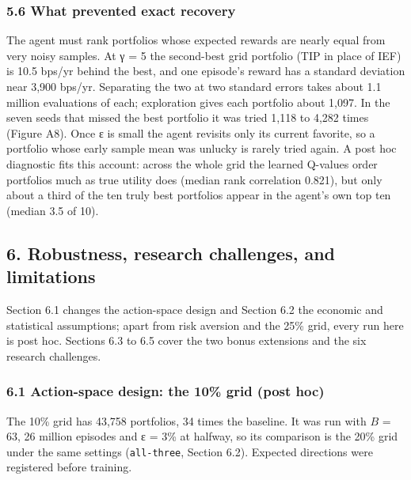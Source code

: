 \documentclass[
  11pt]{article}
\begin{document}
\subsubsection{5.6 What prevented exact
recovery}\label{what-prevented-exact-recovery}

The agent must rank portfolios whose expected rewards are nearly equal
from very noisy samples. At γ = 5 the second-best grid portfolio (TIP in
place of IEF) is 10.5 bps/yr behind the best, and one episode's reward
has a standard deviation near 3,900 bps/yr. Separating the two at two
standard errors takes about 1.1 million evaluations of each; exploration
gives each portfolio about 1,097. In the seven seeds that missed the
best portfolio it was tried 1,118 to 4,282 times (Figure A8). Once ε is
small the agent revisits only its current favorite, so a portfolio whose
early sample mean was unlucky is rarely tried again. A post hoc
diagnostic fits this account: across the whole grid the learned Q-values
order portfolios much as true utility does (median rank correlation
0.821), but only about a third of the ten truly best portfolios appear
in the agent's own top ten (median 3.5 of 10).

\subsection{6. Robustness, research challenges, and
limitations}\label{robustness-research-challenges-and-limitations}

Section 6.1 changes the action-space design and Section 6.2 the economic
and statistical assumptions; apart from risk aversion and the 25\% grid,
every run here is post hoc. Sections 6.3 to 6.5 cover the two bonus
extensions and the six research challenges.

\subsubsection{6.1 Action-space design: the 10\% grid (post
hoc)}\label{action-space-design-the-10-grid-post-hoc}

The 10\% grid has 43,758 portfolios, 34 times the baseline. It was run
with \(B\) = 63, 26 million episodes and ε = 3\% at halfway, so its
comparison is the 20\% grid under the same settings (\texttt{all-three},
Section 6.2). Expected directions were registered before training.
\end{document}
